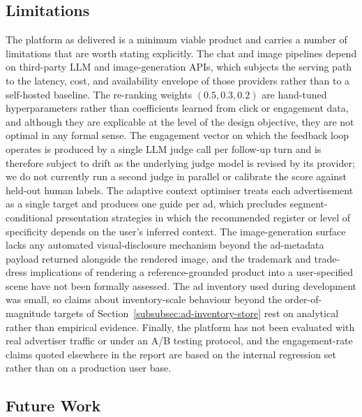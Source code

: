 \subsection{Limitations}
\label{subsec:limitations}

The platform as delivered is a minimum viable product and carries a
number of limitations that are worth stating explicitly. The chat and
image pipelines depend on third-party LLM and image-generation APIs,
which subjects the serving path to the latency, cost, and availability
envelope of those providers rather than to a self-hosted baseline.
The re-ranking weights $(0.5, 0.3, 0.2)$ are hand-tuned
hyperparameters rather than coefficients learned from click or
engagement data, and although they are explicable at the level of the
design objective, they are not optimal in any formal sense. The
engagement vector on which the feedback loop operates is produced by
a single LLM judge call per follow-up turn and is therefore subject
to drift as the underlying judge model is revised by its provider;
we do not currently run a second judge in parallel or calibrate the
score against held-out human labels. The adaptive context optimiser
treats each advertisement as a single target and produces one guide
per ad, which precludes segment-conditional presentation strategies
in which the recommended register or level of specificity depends on
the user's inferred context. The image-generation surface lacks any
automated visual-disclosure mechanism beyond the ad-metadata payload
returned alongside the rendered image, and the trademark and
trade-dress implications of rendering a reference-grounded product
into a user-specified scene have not been formally assessed. The ad
inventory used during development was small, so claims about
inventory-scale behaviour beyond the order-of-magnitude targets of
Section~\ref{subsubsec:ad-inventory-store} rest on analytical rather
than empirical evidence. Finally, the platform has not been evaluated
with real advertiser traffic or under an A/B testing protocol, and
the engagement-rate claims quoted elsewhere in the report are based
on the internal regression set rather than on a production user base.

\subsection{Future Work}
\label{subsec:future-work}

